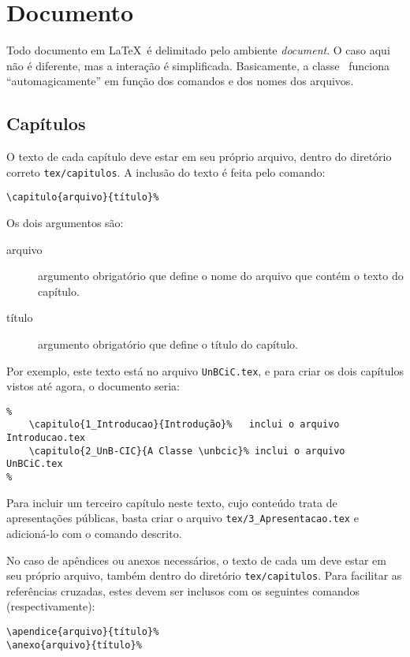 \section{Documento}
Todo documento em \LaTeX\ é delimitado pelo ambiente \emph{document}. O caso aqui
não é diferente, mas a interação é simplificada. Basicamente, a classe \unbcic\
funciona ``automagicamente'' em função dos comandos e dos nomes dos arquivos.


\subsection{Capítulos}
O texto de cada capítulo deve estar em seu próprio arquivo, dentro do diretório
correto \texttt{tex/capitulos}. A inclusão do texto é feita pelo comando:
\begin{verbatim}
\capitulo{arquivo}{título}%
\end{verbatim}

Os dois argumentos são:
\begin{description}%
\item[arquivo] argumento obrigatório que define o nome do arquivo que contém o
texto do capítulo.
\item[título] argumento obrigatório que define o título do capítulo.
\end{description}%

Por exemplo, este texto está no arquivo \texttt{UnBCiC.tex}, e para criar os
dois capítulos vistos até agora, o documento seria:

\begin{verbatim}
%
    \capitulo{1_Introducao}{Introdução}%   inclui o arquivo Introducao.tex
    \capitulo{2_UnB-CIC}{A Classe \unbcic}% inclui o arquivo UnBCiC.tex
%
\end{verbatim}

Para incluir um terceiro capítulo neste texto, cujo conteúdo trata de apresentações
públicas, basta criar o arquivo \texttt{tex/3\_Apresentacao.tex} e
adicioná-lo com o comando descrito.

No caso de apêndices ou anexos necessários, o texto de cada um deve estar em seu
próprio arquivo, também dentro do diretório \texttt{tex/capitulos}. Para facilitar
as referências cruzadas, estes devem ser inclusos com os seguintes comandos
(respectivamente):
\begin{verbatim}
\apendice{arquivo}{título}%
\anexo{arquivo}{título}%
\end{verbatim}


